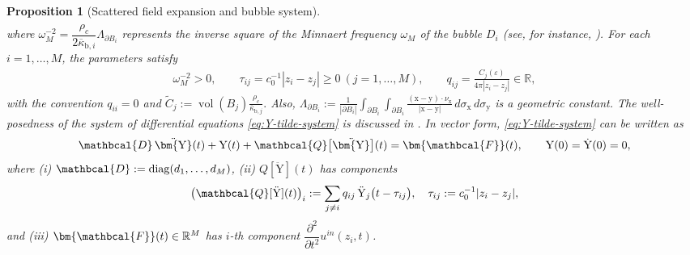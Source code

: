 \documentclass[11pt,a4paper]{article}
\numberwithin{equation}{section}
\newtheorem{proposition}[theorem]{Proposition}
\newcommand{\R}{\mathbb{R}}
\begin{document}
\begin{proposition}[Scattered field expansion and bubble system]
\begin{align}
\end{align}
where $\omega_M^{-2} = \dfrac{\rho_c}{2 \overline{\kappa}_{\mathrm{b},i}} \Lambda_{\partial B_i}$ represents the inverse square of the Minnaert frequency $\omega_M$ of the bubble $D_i$ (see, for instance, \cite{Ammari-1, DGS-21}). For each $i=1,\dots,M$, the parameters satisfy
\begin{align*}
    \omega_M^{-2} > 0,
\qquad \tau_{ij} = c_0^{-1}|z_i - z_j| \ge 0 \ (j=1,\dots,M),
\qquad q_{ij} = \frac{C_j(\varepsilon)}{4\pi |z_i - z_j|} \in \mathbb R,
\end{align*}
with the convention $q_{ii} = 0$ and $\tilde{C}_j := \operatorname{vol}(B_j)\frac{\rho_c}{\overline{\kappa}_{\mathrm{b},j}}.$ Also, $\displaystyle\Lambda_{\partial B_i} := \frac{1}{|\partial B_i|} \int_{\partial B_i} \int_{\partial B_i}
 \frac{(\mathrm{x} - \mathrm{y}) \cdot \nu_\mathrm{x}}{|\mathrm{x} - \mathrm{y}|}
 \, d\sigma_\mathrm{x} \, d\sigma_\mathrm{y}$ is a geometric constant. The well-posedness of the system of differential equations \eqref{eq:Y-tilde-system} is discussed in \cite[Section 2.4]{MukherjeeSiniJEE}. In vector form, \eqref{eq:Y-tilde-system} can be written as
\begin{equation}
\label{eq:Y-tilde-system-vector}
 \mathbcal{D}\,\ddot{\mathrm{\bm{Y}}}(t)
 + \mathrm{Y}(t)
 + \mathbcal{Q}\bigl[\ddot{\mathrm{\bm{Y}}}\bigr](t)
 = \bm{\mathbcal{F}}(t),\qquad
 \mathrm{Y}(0)=\dot{\mathrm{Y}}(0)=0,
\end{equation}
where (i) $\mathbcal{D}:=\mathrm{diag}(d_1,\dots,d_M)$, (ii) $Q[\ddot{\mathrm{Y}}](t)$ has components
\[
 \bigl(\mathbcal{Q}[\ddot{\mathrm{Y}}](t)\bigr)_i
 :=\sum_{j\neq i}q_{ij}\,\ddot{\mathrm{Y}}_j\bigl(t-\tau_{ij}\bigr),
 \quad
 \tau_{ij}:=c_0^{-1}|z_i-z_j|,
\]
and (iii) $\bm{\mathbcal{F}}(t)\in\R^M$ has $i$-th component $\dfrac{\partial^2}{\partial t^2} u^\textit{in}(z_i,t)$.
\end{proposition}
\end{document}
